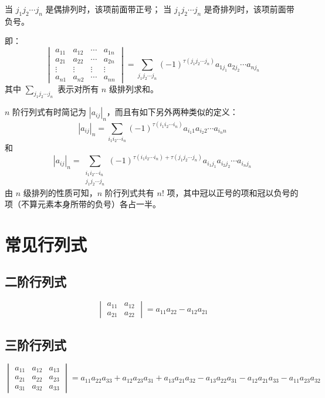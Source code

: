 \documentclass[UTF8]{ctexart}
\theoremstyle{mydef}
\begin{document}
当 $j_1 j_2 \cdots j_n$ 是偶排列时，该项前面带正号；
当 $j_1 j_2 \cdots j_n$ 是奇排列时，该项前面带负号。

即：
$$
\begin{vmatrix}
a_{11} & a_{12} & \cdots & a_{1n} \\
a_{21} & a_{22} & \cdots & a_{2n} \\
\vdots & \vdots & \vdots & \vdots \\
a_{n1} & a_{n2} & \cdots & a_{nn}
\end{vmatrix}
= \sum_{j_1 j_2 \cdots j_n} (-1)^{\tau(j_1 j_2 \cdots j_n)} a_{1j_1} a_{2j_2} \cdots a_{nj_n}
$$
其中 $\sum_{j_1 j_2 \cdots j_n}$ 表示对所有 $n$ 级排列求和。

$n$ 阶行列式有时简记为 $|a_{ij}|_n$，而且有如下另外两种类似的定义：
$$
|a_{ij}|_n = \sum_{i_1 i_2 \cdots i_n} (-1)^{\tau(i_1 i_2 \cdots i_n)} a_{i_1 1} a_{i_2 2} \cdots a_{i_n n}
$$
和
$$
|a_{ij}|_n = \sum_{\substack{i_1 i_2 \cdots i_n \\ j_1 j_2 \cdots j_n}} (-1)^{\tau(i_1 i_2 \cdots i_n) + \tau(j_1 j_2 \cdots j_n)} a_{i_1 j_1} a_{i_2 j_2} \cdots a_{i_n j_n}
$$
由 $n$ 级排列的性质可知，$n$ 阶行列式共有 $n!$ 项，其中冠以正号的项和冠以负号的项（不算元素本身所带的负号）各占一半。

\section{常见行列式}

\subsection{二阶行列式}
$$
\begin{vmatrix}
a_{11} & a_{12} \\
a_{21} & a_{22}
\end{vmatrix}
= a_{11}a_{22} - a_{12}a_{21}
$$

\subsection{三阶行列式}
$$
\begin{vmatrix}
a_{11} & a_{12} & a_{13} \\
a_{21} & a_{22} & a_{23} \\
a_{31} & a_{32} & a_{33}
\end{vmatrix}
= a_{11}a_{22}a_{33} + a_{12}a_{23}a_{31} + a_{13}a_{21}a_{32} - a_{13}a_{22}a_{31} - a_{12}a_{21}a_{33} - a_{11}a_{23}a_{32}
$$
\end{document}
